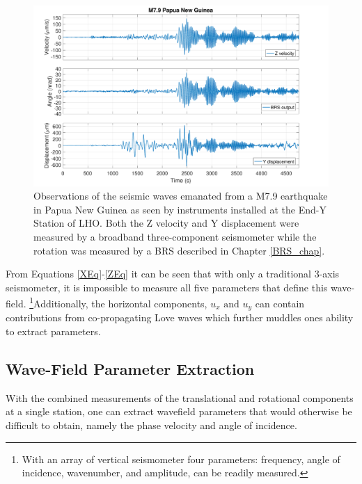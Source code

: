 \documentclass [12pt, proquest]{uwthesis}[2019]
\begin{document}
\begin{figure}%
\begin{center}
\includegraphics[width=\textwidth]{PNGTimeSeries.pdf}
\caption[Observations of the seismic waves by instruments installed at the End-Y Station of LHO]{Observations of the seismic waves emanated from a M7.9 earthquake in Papua New Guinea as seen by instruments installed at the End-Y Station of LHO. \cite{tiltSeismology} Both the Z velocity and Y displacement were measured by a broadband three-component seismometer while the rotation was measured by a BRS described in Chapter \ref{BRS_chap}. }
\label{Earthquake}
\end{center}
\end{figure}

From Equations \ref{XEq}-\ref{ZEq} it can be seen that with only a traditional 3-axis seismometer, it is impossible to measure all five parameters that define this wave-field. \footnote{With an array of vertical seismometer four parameters: frequency, angle of incidence, wavenumber, and amplitude, can be readily measured.}Additionally, the horizontal components, $u_x\text{ and }u_y$ can contain contributions from co-propagating Love waves which further muddles ones ability to extract parameters. 


\subsection{Wave-Field Parameter Extraction}

With the combined measurements of the translational and rotational components at a single station, one can extract wavefield parameters that would otherwise be difficult to obtain, namely the phase velocity and angle of incidence. 
\end{document}
